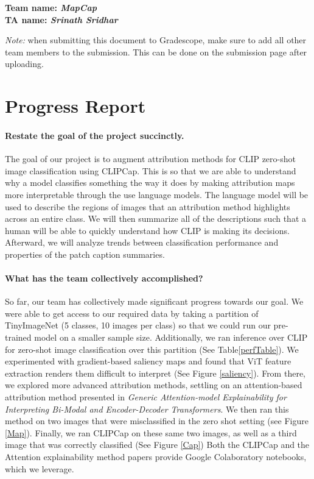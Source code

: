 \textbf{Team name: \emph{MapCap}}\\
\textbf{TA name: \emph{Srinath Sridhar}}

\emph{Note:} when submitting this document to Gradescope, make sure to add all other team members to the submission. This can be done on the submission page after uploading.

\section*{Progress Report}

\paragraph{Restate the goal of the project succinctly.}
The goal of our project is to augment attribution methods for CLIP zero-shot image classification using CLIPCap. This is so that we are able to understand why a model classifies something the way it does by making attribution maps more interpretable through the use language models. The language model will be used to describe the regions of images that an attribution method highlights across an entire class. We will then summarize all of the descriptions such that a human will be able to quickly understand how CLIP is making its decisions. Afterward, we will analyze trends between classification performance and properties of the patch caption summaries. 

\paragraph{What has the team collectively accomplished?}
So far, our team has collectively made significant progress towards our goal. We were able to get access to our required data by taking a partition of TinyImageNet (5 classes, 10 images per class) so that we could run our pre-trained model on a smaller sample size. Additionally, we ran inference over CLIP for zero-shot image classification over this partition (See Table\ref{perfTable}). We experimented with gradient-based saliency maps and found that ViT feature extraction renders them difficult to interpret (See Figure \ref{saliency}). From there, we explored more advanced attribution methods, settling on an attention-based attribution method presented in \textit{Generic Attention-model Explainability for Interpreting Bi-Modal and Encoder-Decoder Transformers}. We then ran this method on two images that were misclassified in the zero shot setting (see Figure \ref{Map}). Finally, we ran CLIPCap on these same two images, as well as a third image that was correctly classified (See Figure \ref{Cap}) Both the CLIPCap and the Attention explainability method papers provide Google Colaboratory notebooks, which we leverage.


